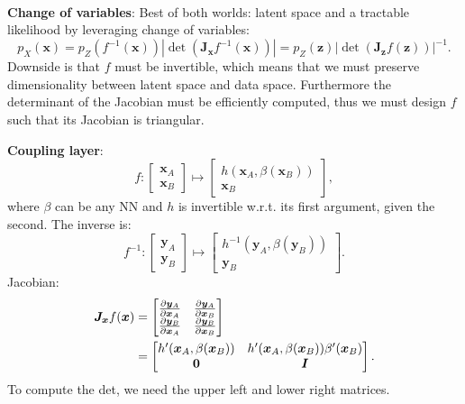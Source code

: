 \documentclass{article}
\renewcommand{\vec}[1]{\bm{#1}}
\newcommand{\mat}[1]{\bm{#1}}
\newenvironment{topic}[1]
{\textbf{\sffamily \colorbox{black}{\rlap{\textbf{\textcolor{white}{#1}}}\hspace{\linewidth}\hspace{-2\fboxsep}}} \\ \vspace{0.2cm}}
{}
\begin{document}
\begin{multicols*}{2}
\begin{topic}{Normalizing flow}
        \textbf{Change of variables}: Best of both worlds: latent space and a tractable likelihood by
        leveraging change of variables: \[
            p_X(\vec{x}) = p_Z(f^{-1}(\vec{x})) | \det(\mat{J}_{\vec{x}} f^{-1}(\vec{x})) | = p_Z(\vec{z}) |\det(\mat{J}_{\vec{z}} f(\vec{z}))|^{-1}.
        \]
        Downside is that $f$ must be invertible, which means that we must preserve dimensionality between
        latent space and data space. Furthermore the determinant of the Jacobian must be efficiently
        computed, thus we must design $f$ such that its Jacobian is triangular.

        \textbf{Coupling layer}: \[
            f: \begin{bmatrix}
                \vec{x}_A \\ \vec{x}_B
            \end{bmatrix}
            \mapsto
            \begin{bmatrix}
                h(\vec{x}_A, \beta(\vec{x}_B)) \\
                \vec{x}_B
            \end{bmatrix},
        \]
        where $\beta$ can be any NN and $h$ is invertible w.r.t. its first argument, given the second. The
        inverse is: \[
            f^{-1}: \begin{bmatrix}
                \vec{y}_A \\
                \vec{y}_B
            \end{bmatrix}
            \mapsto
            \begin{bmatrix}
                h^{-1}(\vec{y}_A, \beta(\vec{y}_B)) \\
                \vec{y}_B
            \end{bmatrix}.
        \]
        Jacobian:
        \begin{align*}
            \mat{J}_{\vec{x}} f(\vec{x}) & = \begin{bmatrix}
                                                 \pdv{\vec{y}_A}{\vec{x}_A} & \pdv{\vec{y}_A}{\vec{x}_B} \\
                                                 \pdv{\vec{y}_B}{\vec{x}_A} & \pdv{\vec{y}_B}{\vec{x}_B}
                                             \end{bmatrix} \\
                                         & = \begin{bmatrix}
                                                 h'(\vec{x}_A, \beta(\vec{x}_B)) & h'(\vec{x}_A, \beta(\vec{x}_B)) \beta'(\vec{x}_B) \\
                                                 \mat{0}                         & \mat{I}
                                             \end{bmatrix}.
        \end{align*}
        To compute the det, we need the upper left and lower right matrices.


\end{topic}
\end{multicols*}
\end{document}
